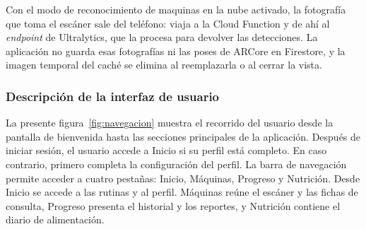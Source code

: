 Con el modo de reconocimiento de maquinas en la nube activado, la fotografía que toma el
escáner sale del teléfono: viaja a la Cloud Function y de ahí al \emph{endpoint}
de Ultralytics, que la procesa para devolver las detecciones. La aplicación no
guarda esas fotografías ni las poses de ARCore en Firestore, y la imagen
temporal del caché se elimina al reemplazarla o al cerrar la vista.

\subsubsection{Descripción de la interfaz de usuario}

La presente figura~\ref{fig:navegacion} muestra el recorrido del usuario desde la
pantalla de bienvenida hasta las secciones principales de la aplicación.
Después de iniciar sesión, el usuario accede a Inicio si su perfil está
completo. En caso contrario, primero completa la configuración del perfil.
La barra de navegación permite acceder a cuatro pestañas: Inicio, Máquinas,
Progreso y Nutrición. Desde Inicio se accede a las rutinas y al perfil.
Máquinas reúne el escáner y las fichas de consulta, Progreso presenta el
historial y los reportes, y Nutrición contiene el diario de alimentación.

